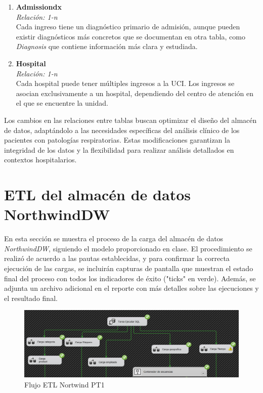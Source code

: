 \documentclass[12pt, a4paper, twoside]{article}
\begin{document}
\begin{enumerate}
		\item \textbf{Admissiondx} \\
		\textit{Relación: 1-n} \\
		Cada ingreso tiene un diagnóstico primario de admisión, aunque pueden existir diagnósticos  más concretos que se documentan en otra tabla, como \textit{Diagnosis} que contiene información más clara y estudiada.
		
		\item \textbf{Hospital} \\
		\textit{Relación: 1-n} \\
		Cada hospital puede tener múltiples ingresos a la UCI. Los ingresos se asocian exclusivamente a un hospital, dependiendo del centro de atención en el que se encuentre la unidad.
	\end{enumerate}

	

	
	Los cambios en las relaciones entre tablas buscan optimizar el diseño del almacén de datos, adaptándolo a las necesidades específicas del análisis clínico de los pacientes con patologías respiratorias. Estas modificaciones garantizan la integridad de los datos y la flexibilidad para realizar análisis detallados en contextos hospitalarios. 
	
	
	\section{ETL del almacén de datos NorthwindDW}
	
	En esta sección se muestra el proceso de la carga del almacén de datos \textit{NorthwindDW}, siguiendo el modelo proporcionado en clase. El procedimiento se realizó de acuerdo a las pautas establecidas, y para confirmar la correcta ejecución de las cargas, se incluirán capturas de pantalla que muestran el estado final del proceso con todos los indicadores de éxito ("ticks" en verde). Además, se adjunta un archivo adicional en el reporte con más detalles sobre las ejecuciones y el resultado final.
	
	
	\begin{figure}[H]
		\centering
		\includegraphics[width=1\textwidth]{image/flujo_north_1.png}
		\caption{Flujo ETL Nortwind PT1}
		\label{fig:5}
	\end{figure}
	
\end{document}
